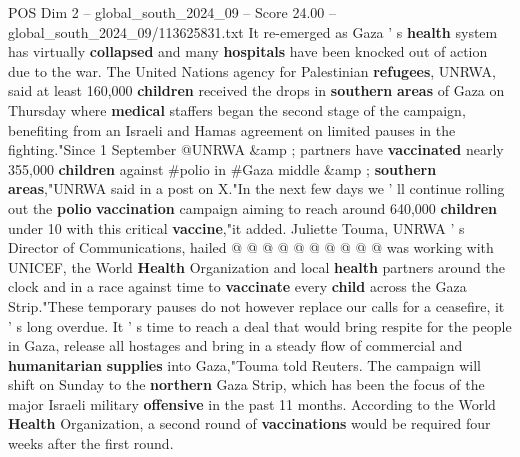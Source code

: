 \begin{textsample}{POS Dim 2 – global\_south\_2024\_09 – Score 24.00 – global\_south\_2024\_09/113625831.txt}
It re-emerged as Gaza ' s \textbf{health} system has virtually \textbf{collapsed} and many \textbf{hospitals} have been knocked out of action due to the war.
The United Nations agency for Palestinian \textbf{refugees}, UNRWA, said at least 160,000 \textbf{children} received the drops in \textbf{southern} \textbf{areas} of Gaza on Thursday where \textbf{medical} staffers began the second stage of the campaign, benefiting from an Israeli and Hamas agreement on limited pauses in the fighting."Since 1 September @UNRWA \&amp ; partners have \textbf{vaccinated} nearly 355,000 \textbf{children} against \#polio in \#Gaza middle \&amp ; \textbf{southern} \textbf{areas},"UNRWA said in a post on X."In the next few days we ' ll continue rolling out the \textbf{polio} \textbf{vaccination} campaign aiming to reach around 640,000 \textbf{children} under 10 with this critical \textbf{vaccine},"it added.
Juliette Touma, UNRWA ' s Director of Communications, hailed @ @ @ @ @ @ @ @ @ @ was working with UNICEF, the World \textbf{Health} Organization and local \textbf{health} partners around the clock and in a race against time to \textbf{vaccinate} every \textbf{child} across the Gaza Strip."These temporary pauses do not however replace our calls for a ceasefire, it ' s long overdue.
It ' s time to reach a deal that would bring respite for the people in Gaza, release all hostages and bring in a steady flow of commercial and \textbf{humanitarian} \textbf{supplies} into Gaza,"Touma told Reuters.
The campaign will shift on Sunday to the \textbf{northern} Gaza Strip, which has been the focus of the major Israeli military \textbf{offensive} in the past 11 months.
According to the World \textbf{Health} Organization, a second round of \textbf{vaccinations} would be required four weeks after the first round.

\end{textsample}
